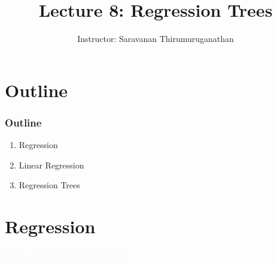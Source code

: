\documentclass{beamer}
\title[Saravanan Thirumuruganathan] 
{Lecture 8: Regression Trees}
\author[CSE 5334] 
{Instructor: Saravanan Thirumuruganathan}
\date[]
\newcommand{\thblue}[1]{{\Huge {\textcolor{azure}{#1}}}}
\begin{document}
\begin{frame}
  \titlepage
\end{frame}


\section{Outline}

\begin{frame}
\frametitle {Outline}
    \begin{enumerate}
        \item Regression
        \item Linear Regression
        \item Regression Trees
    \end{enumerate}
\end{frame}




\section{Regression}
\begin{frame}{} 
    \begin{center}
        \thblue{Regression and Linear Regression}
    \end{center}
\end{frame}
\end{document}
